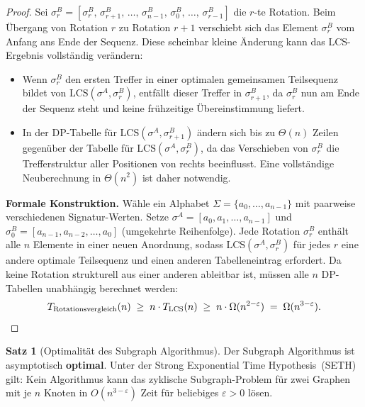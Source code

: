 \documentclass[a4paper,12pt]{article}
\theoremstyle{definition}
\newtheorem{satz}{Satz}
\begin{document}
\begin{proof}
Sei $\sigma^B_r = [\sigma_r^B,\, \sigma_{r+1}^B,\, \ldots,\, \sigma_{n-1}^B,\, \sigma_0^B,\, \ldots,\, \sigma_{r-1}^B]$ die $r$-te Rotation.
Beim Übergang von Rotation $r$ zu Rotation $r+1$ verschiebt sich das Element $\sigma_r^B$ vom Anfang ans Ende der Sequenz.
Diese scheinbar kleine Änderung kann das LCS-Ergebnis vollständig verändern:

\begin{itemize}
	\item Wenn $\sigma_r^B$ den ersten Treffer in einer optimalen gemeinsamen Teilsequenz bildet von $\mathrm{LCS}(\sigma^A, \sigma^B_r)$, entfällt dieser Treffer in $\sigma^B_{r+1}$,
	      da $\sigma_r^B$ nun am Ende der Sequenz steht und keine frühzeitige Übereinstimmung liefert.
	\item In der DP-Tabelle für $\mathrm{LCS}(\sigma^A, \sigma^B_{r+1})$ ändern sich bis zu $\Theta(n)$
	      Zeilen gegenüber der Tabelle für $\mathrm{LCS}(\sigma^A, \sigma^B_r)$, da das Verschieben von
	      $\sigma_r^B$ die Trefferstruktur aller Positionen von rechts beeinflusst.
	      Eine vollständige Neuberechnung in $\Theta(n^2)$ ist daher notwendig.
\end{itemize}

\textbf{Formale Konstruktion.}
Wähle ein Alphabet $\Sigma = \{a_0, \ldots, a_{n-1}\}$ mit paarweise verschiedenen Signatur-Werten.
Setze $\sigma^A = [a_0, a_1, \ldots, a_{n-1}]$ und $\sigma^B_0 = [a_{n-1}, a_{n-2}, \ldots, a_0]$
(umgekehrte Reihenfolge).
Jede Rotation $\sigma^B_r$ enthält alle $n$ Elemente in einer neuen Anordnung, sodass
$\mathrm{LCS}(\sigma^A, \sigma^B_r)$ für jedes $r$ eine andere optimale Teilsequenz und einen anderen Tabelleneintrag erfordert.
Da keine Rotation strukturell aus einer anderen ableitbar ist, müssen alle $n$ DP-Tabellen unabhängig berechnet werden:
\[
	T_{\text{Rotationsvergleich}}(n) \;\geq\; n \cdot T_{\mathrm{LCS}}(n) \;\geq\; n \cdot \Omega(n^{2-\varepsilon}) \;=\; \Omega(n^{3-\varepsilon}). \qedhere
\]
\end{proof}

\begin{satz}[Optimalität des Subgraph Algorithmus]
\label{satz:optimalitaet}
Der Subgraph Algorithmus ist asymptotisch \textbf{optimal}.
Unter der Strong Exponential Time Hypothesis~(SETH) gilt: Kein Algorithmus kann das zyklische Subgraph-Problem für zwei Graphen mit je $n$ Knoten in $O(n^{3-\varepsilon})$ Zeit für beliebiges $\varepsilon > 0$ lösen.
\end{satz}
\end{document}
